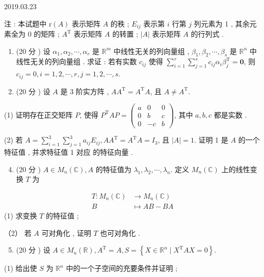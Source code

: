 \documentclass[10pt]{article}
\begin{document}
   

2019.03.23

 注 :  本试题中  $\mathrm{r}(A)$  表示矩阵  $A$  的秩 ; $E_{i j}$  表示第  $i$  行第  $j$  列元素为  1 ,  其余元素全为  0  的矩阵 ; $A^{\mathrm{T}}$  表示矩阵  $A$  的转置 ; $|A|$  表示矩阵  $A$  的行列式 .

\begin{enumerate}
  \item (20  分 )  设  $\alpha_{1}, \alpha_{2}, \cdots, \alpha_{r}$  是  $\mathbb{R}^{m}$  中线性无关的列向量组 , $\beta_{1}, \beta_{2}, \cdots, \beta_{s}$  是  $\mathbb{R}^{n}$  中线性无关的列向量组 .  求证 :  若有实数  $c_{i j}$  使得  $\sum_{i=1}^{r} \sum_{j=1}^{s} c_{i j} \alpha_{i} \beta_{j}^{\mathrm{T}}=\mathbf{0}$,  则  $c_{i j}=0, i=1,2, \cdots, r, j=1,2, \cdots, s$.

  \item (20  分 )  设  $A$  是  3  阶实方阵 , $A A^{\mathrm{T}}=A^{\mathrm{T}} A$,  且  $A \neq A^{\mathrm{T}}$.

\end{enumerate}
(1)  证明存在正交矩阵  $P$,  使得  $P^{\mathrm{T}} A P=\left(\begin{array}{ccc}a & 0 & 0 \\ 0 & b & c \\ 0 & -c & b\end{array}\right)$,  其中  $a, b, c$  都是实数 .

(2)  若  $A=\sum_{i=1}^{3} \sum_{j=1}^{3} a_{i j} E_{i j}, A A^{\mathrm{T}}=A^{\mathrm{T}} A=I_{3}$,  且  $|A|=1$.  证明  1  是  $A$  的一个特征值 ,  并求特征值  1  对应   的特征向量 .

\begin{enumerate}
  \setcounter{enumi}{3}
  \item (20  分 ) $A \in M_{n}(\mathbb{C}), A$  的特征值为  $\lambda_{1}, \lambda_{2}, \cdots, \lambda_{n}$.  定义  $M_{n}(\mathbb{C})$  上的线性变换  $T$  为 
\end{enumerate}
$$
\begin{aligned}
T: M_{n}(\mathbb{C}) & \longrightarrow M_{n}(\mathbb{C}) \\
B & \mapsto A B-B A
\end{aligned}
$$
(1)  求变换  $T$  的特征值 ;

（2） 若  $A$  可对角化 ,  证明  $T$  也可对角化 .

\begin{enumerate}
  \setcounter{enumi}{4}
  \item (20  分 )  设  $A \in M_{n}(\mathbb{R}), A^{\mathrm{T}}=A, S=\left\{X \in \mathbb{R}^{n} \mid X^{\mathrm{T}} A X=0\right\}$.
\end{enumerate}
(1)  给出使  $S$  为  $\mathbb{R}^{n}$  中的一个子空间的充要条件并证明 ;
\end{document}
